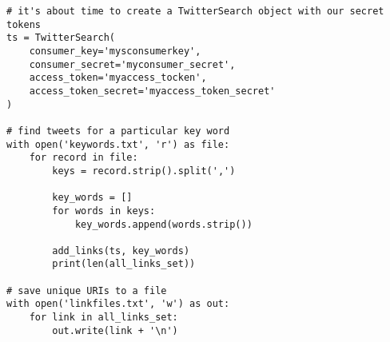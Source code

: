 \begin{lstlisting}[style=numbers]
# it's about time to create a TwitterSearch object with our secret tokens
ts = TwitterSearch(
    consumer_key='mysconsumerkey',
    consumer_secret='myconsumer_secret',
    access_token='myaccess_tocken',
    access_token_secret='myaccess_token_secret'
)

# find tweets for a particular key word
with open('keywords.txt', 'r') as file:
    for record in file:
        keys = record.strip().split(',')

        key_words = []
        for words in keys:
            key_words.append(words.strip())

        add_links(ts, key_words)
        print(len(all_links_set))

# save unique URIs to a file
with open('linkfiles.txt', 'w') as out:
    for link in all_links_set:
        out.write(link + '\n')

\end{lstlisting}